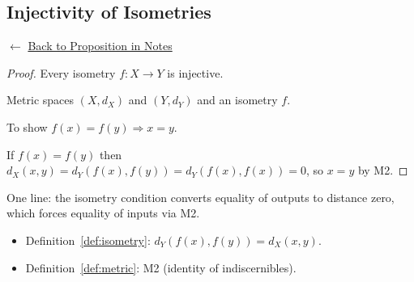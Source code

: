 
\subsection*{Injectivity of Isometries}
\label{prf:isometry-injective}

\begin{remark*}[Return]
$\leftarrow$ \hyperref[prop:isometry-injective]{Back to Proposition in Notes}
\end{remark*}

\begin{proof}
\Claim Every isometry $f : X \to Y$ is injective.

\Given Metric spaces $(X,d_X)$ and $(Y,d_Y)$ and an isometry $f$.

\Goal To show $f(x) = f(y) \Rightarrow x = y$.

\Strategy If $f(x) = f(y)$ then $d_X(x,y) = d_Y(f(x),f(y)) = d_Y(f(x),f(x)) = 0$,
so $x = y$ by M2.


\end{proof}

\begin{remark*}
One line: the isometry condition converts equality of outputs to distance zero,
which forces equality of inputs via M2.
\end{remark*}

\begin{remark*}[Dependencies]
\begin{itemize}
  \item Definition~\ref{def:isometry}: $d_Y(f(x),f(y)) = d_X(x,y)$.
  \item Definition~\ref{def:metric}: M2 (identity of indiscernibles).
\end{itemize}
\end{remark*}
